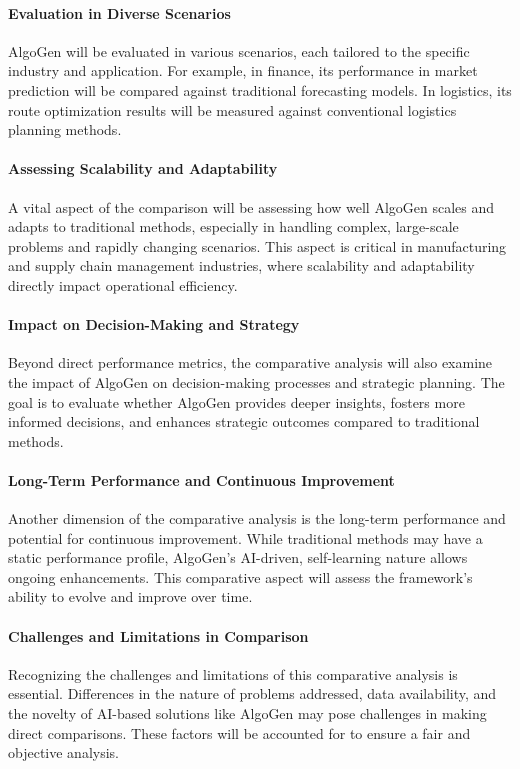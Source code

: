 \documentclass{article}
\begin{document}
\paragraph{Evaluation in Diverse Scenarios}
AlgoGen will be evaluated in various scenarios, each tailored to the specific industry and application. For example, in finance, its performance in market prediction will be compared against traditional forecasting models. In logistics, its route optimization results will be measured against conventional logistics planning methods.

\paragraph{Assessing Scalability and Adaptability}
A vital aspect of the comparison will be assessing how well AlgoGen scales and adapts to traditional methods, especially in handling complex, large-scale problems and rapidly changing scenarios. This aspect is critical in manufacturing and supply chain management industries, where scalability and adaptability directly impact operational efficiency.

\paragraph{Impact on Decision-Making and Strategy}
Beyond direct performance metrics, the comparative analysis will also examine the impact of AlgoGen on decision-making processes and strategic planning. The goal is to evaluate whether AlgoGen provides deeper insights, fosters more informed decisions, and enhances strategic outcomes compared to traditional methods.

\paragraph{Long-Term Performance and Continuous Improvement}
Another dimension of the comparative analysis is the long-term performance and potential for continuous improvement. While traditional methods may have a static performance profile, AlgoGen’s AI-driven, self-learning nature allows ongoing enhancements. This comparative aspect will assess the framework's ability to evolve and improve over time.

\paragraph{Challenges and Limitations in Comparison}
Recognizing the challenges and limitations of this comparative analysis is essential. Differences in the nature of problems addressed, data availability, and the novelty of AI-based solutions like AlgoGen may pose challenges in making direct comparisons. These factors will be accounted for to ensure a fair and objective analysis.
\end{document}
